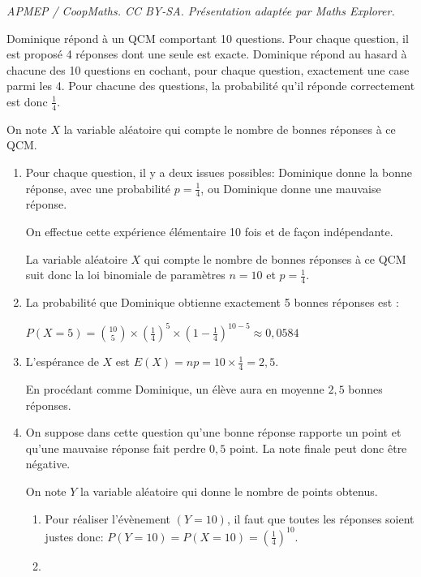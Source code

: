 \documentclass[10pt]{article}
\providecommand{\np}[2][]{{#2~#1}}
\begin{document}
\noindent\textit{APMEP / CoopMaths. CC BY-SA. Présentation adaptée par Maths Explorer.}\par\medskip
Dominique répond à un QCM comportant 10 questions.
Pour chaque question, il est proposé 4 réponses dont une seule est exacte.
Dominique répond au hasard à chacune des 10 questions en cochant, pour chaque question, exactement une case parmi les 4.
Pour chacune des questions, la probabilité qu'il réponde correctement est donc $\frac{1}{4}$.

On note $X$ la variable aléatoire qui compte le nombre de bonnes réponses à ce QCM.

\begin{enumerate}
\item 
Pour chaque question, il y a deux issues possibles: Dominique donne la bonne réponse, avec une probabilité $p=\frac{1}{4}$, ou Dominique donne une mauvaise réponse.

On effectue cette expérience élémentaire 10 fois et de façon indépendante.

La variable aléatoire $X$ qui compte le nombre de bonnes réponses à ce QCM suit donc la loi binomiale de paramètres $n=10$ et $p=\frac{1}{4}$.

\item 
La probabilité que Dominique obtienne exactement 5 bonnes réponses est :

$P\left (X=5\right ) = \binom{10}{5} \times \left (\frac{1}{4}\right )^5 \times \left (1-\frac{1}{4}\right )^{10-5}\approx \np{0,0584}$

\item 
L'espérance de $X$ est $E(X)=np = 10\times \frac{1}{4}= 2,5$.

En procédant comme Dominique, un élève aura en moyenne $2,5$ bonnes réponses.

\item On suppose dans cette question qu'une bonne réponse rapporte un point et qu'une mauvaise réponse fait perdre $0,5$ point. La note finale peut donc être négative.

On note $Y$ la variable aléatoire qui donne le nombre de points obtenus.

	\begin{enumerate}
		\item 
Pour réaliser l'évènement $(Y=10)$, il faut que toutes les réponses soient justes donc:
$P\left (Y = 10\right )=P\left (X = 10\right ) = \left (\frac{1}{4}\right )^{10}$.		
				
		\item 
{}


\end{enumerate}
\end{enumerate}
\end{document}
